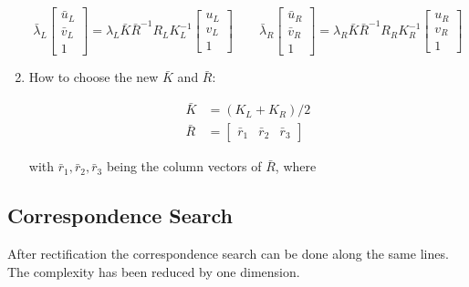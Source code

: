 \documentclass[10pt,a4paper]{scrartcl}
\begin{document}
\begin{multicols*}{2}
\begin{enumerate}
\begin{equation*}
\bar{\lambda}_L\begin{bmatrix}
\bar{u}_L\\
\bar{v}_L\\
1
\end{bmatrix}=\lambda_L\bar{K}\bar{R}^{-1}R_LK_L^{-1}\begin{bmatrix}
u_L\\
v_L\\
1
\end{bmatrix}\qquad\bar{\lambda}_R\begin{bmatrix}
\bar{u}_R\\
\bar{v}_R\\
1
\end{bmatrix}=\lambda_R\bar{K}\bar{R}^{-1}R_RK_R^{-1}\begin{bmatrix}
u_R\\
v_R\\
1
\end{bmatrix}
\end{equation*}
\item How to choose the new $\bar{K}$ and $\bar{R}$:

\begin{align*}
\bar{K}&=(K_L+K_R)/2\\
\bar{R}&=\begin{bmatrix}
\bar{r}_1&\bar{r}_2&\bar{r}_3
\end{bmatrix}
\end{align*}

with $\bar{r}_1,\bar{r}_2,\bar{r}_3$ being the column vectors of $\bar{R}$, where

\end{enumerate}

\subsection{Correspondence Search}

After rectification the correspondence search can be done along the same lines. The complexity has been reduced by one dimension.


\end{multicols*}
\end{document}
